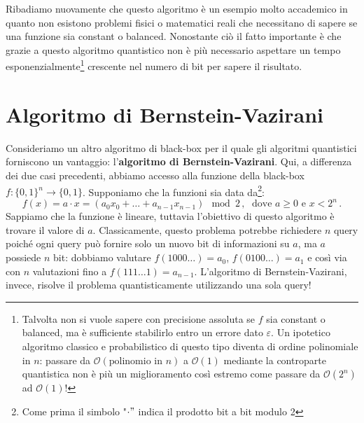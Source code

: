 \noindent Ribadiamo nuovamente che questo algoritmo è un esempio molto accademico in quanto non esistono problemi fisici o matematici reali che necessitano di sapere se una funzione sia constant o balanced. Nonostante ciò il fatto importante è che grazie a questo algoritmo quantistico non è più necessario aspettare un tempo esponenzialmente\footnote{Talvolta non si vuole sapere con precisione assoluta se $f$ sia constant o balanced, ma è sufficiente stabilirlo entro un errore dato $\varepsilon$. Un ipotetico algoritmo classico e probabilistico di questo tipo diventa di ordine polinomiale in $n$: passare da $\mathcal{O}(\text{polinomio in }n)$ a $\mathcal{O}(1)$ mediante la controparte quantistica non è più un miglioramento così estremo come passare da $\mathcal{O}(2^n)$ ad $\mathcal{O}(1)$!} crescente nel numero di bit per sapere il risultato. 

\section{Algoritmo di Bernstein-Vazirani}
Consideriamo un altro algoritmo di black-box per il quale gli algoritmi quantistici forniscono un vantaggio: l'\textbf{algoritmo di Bernstein-Vazirani}. Qui, a differenza dei due casi precedenti, abbiamo accesso alla funzione della black-box $f: \{0, 1\}^n \rightarrow \{0, 1\}$. Supponiamo che la funzioni sia data da\footnote{Come prima il simbolo "$\cdot"$ indica il prodotto bit a bit modulo 2}:
\begin{equation*}
    f(x) = a\cdot x = (a_0 x_0 + \ldots + a_{n-1} x_{n-1})\mod{2} \, , \; \text{ dove } a \geq 0 \text{ e } x < 2^n \, .
\end{equation*}
Sappiamo che la funzione è lineare, tuttavia l'obiettivo di questo algoritmo è trovare il valore di $a$. Classicamente, questo problema potrebbe richiedere $n$ query poiché ogni query può fornire solo un nuovo bit di informazioni su $a$, ma $a$ possiede $n$ bit: dobbiamo valutare $f(1000\ldots) = a_0$, $f(0100\ldots) = a_1$ e così via con $n$ valutazioni fino a $f(111\ldots1) = a_{n-1}$. L'algoritmo di Bernstein-Vazirani, invece, risolve il problema quantisticamente utilizzando una sola query!

